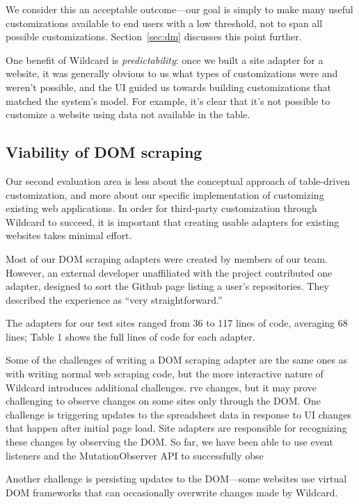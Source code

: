 \documentclass[sigplan,10pt,anonymous,review]{acmart}
\begin{document}
We consider this an acceptable outcome---our goal is simply to make many
useful customizations available to end users with a low threshold, not
to span all possible customizations. Section~\ref{sec:dm} discusses this
point further.

One benefit of Wildcard is \emph{predictability}: once we built a site
adapter for a website, it was generally obvious to us what types of
customizations were and weren't possible, and the UI guided us towards
building customizations that matched the system's model. For example,
it's clear that it's not possible to customize a website using data not
available in the table.

\hypertarget{viability-of-dom-scraping}{%
\subsection{Viability of DOM scraping}\label{viability-of-dom-scraping}}

Our second evaluation area is less about the conceptual approach of
table-driven customization, and more about our specific implementation
of customizing existing web applications. In order for third-party
customization through Wildcard to succeed, it is important that creating
usable adapters for existing websites takes minimal effort.

Most of our DOM scraping adapters were created by members of our team.
However, an external developer unaffiliated with the project contributed
one adapter, designed to sort the Github page listing a user's
repositories. They described the experience as ``very straightforward.''

The adapters for our test sites ranged from 36 to 117 lines of code,
averaging 68 lines; Table 1 shows the full lines of code for each
adapter.

Some of the challenges of writing a DOM scraping adapter are the same
ones as with writing normal web scraping code, but the more interactive
nature of Wildcard introduces additional challenges. rve changes, but it
may prove challenging to observe changes on some sites only through the
DOM. One challenge is triggering updates to the spreadsheet data in
response to UI changes that happen after initial page load. Site
adapters are responsible for recognizing these changes by observing the
DOM. So far, we have been able to use event listeners and the
MutationObserver API to successfully obse

Another challenge is persisting updates to the DOM---some websites use
virtual DOM frameworks that can occasionally overwrite changes made by
Wildcard.
\end{document}
